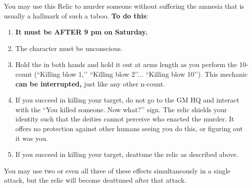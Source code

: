 \documentclass[green]{GL2020}
\begin{document}
You may use this Relic to murder someone without suffering the amnesia that is usually a hallmark of such a taboo. \textbf{To do this}:
\begin{enumerate}
  \item \textbf{It must be AFTER 9 pm on Saturday.}
  \item The character must be unconscious.
  \item Hold the \iScythe{} in both hands and hold it out at arms length as you perform the 10-count (``Killing blow 1,’’ ``Killing blow 2’’... ``Killing blow 10’’). This mechanic \textbf{can be interrupted,} just like any other n-count.
  \item If you succeed in killing your target, do not go to the GM HQ and interact with the ``You killed someone. Now what?’’ sign. The relic shields your identity such that the deities cannot perceive who enacted the murder. It offers no protection against other humans seeing you do this, or figuring out it was you.
  \item If you succeed in killing your target, deattune the relic as described above.
\end{enumerate}

You may use two or even all three of these effects simultaneously in a single attack, but the relic will become deattuned after that attack. 
\end{document}
